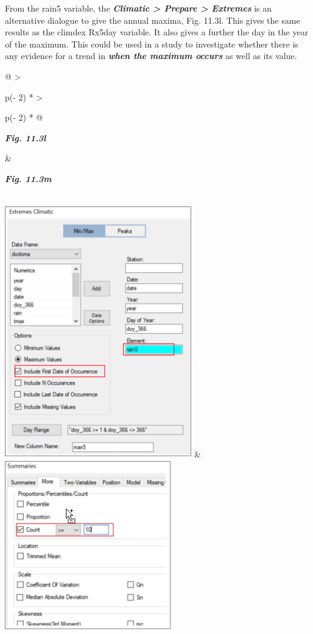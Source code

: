 \documentclass[
  letterpaper,
  DIV=11,
  numbers=noendperiod]{scrreprt}
\begin{document}
From the rain5 variable, the \textbf{\emph{Climatic \textgreater{}
Prepare \textgreater{} Extremes}} is an alternative dialogue to give the
annual maxima, Fig. 11.3l. This gives the same results as the climdex
Rx5day variable. It also gives a further the day in the year of the
maximum. This could be used in a study to investigate whether there is
any evidence for a trend in \textbf{\emph{when the maximum occurs}} as
well as its value.

\begin{longtable}[]{@{}
  >{\raggedright\arraybackslash}p{(\columnwidth - 2\tabcolsep) * }
  >{\raggedright\arraybackslash}p{(\columnwidth - 2\tabcolsep) * }@{}}
\toprule\noalign{}
\begin{minipage}[b]{\linewidth}\raggedright
\textbf{\emph{Fig. 11.3l}}
\end{minipage} & \begin{minipage}[b]{\linewidth}\raggedright
\textbf{\emph{Fig. 11.3m}}
\end{minipage} \\
\midrule\noalign{}
\endhead
\bottomrule\noalign{}
\endlastfoot
\includegraphics[width=3.19083in,height=4.30955in]{figures/Fig11.3l.png}
&
\includegraphics[width=2.83805in,height=2.9135in]{figures/Fig11.3m.png} \\
\end{longtable}
\end{document}
